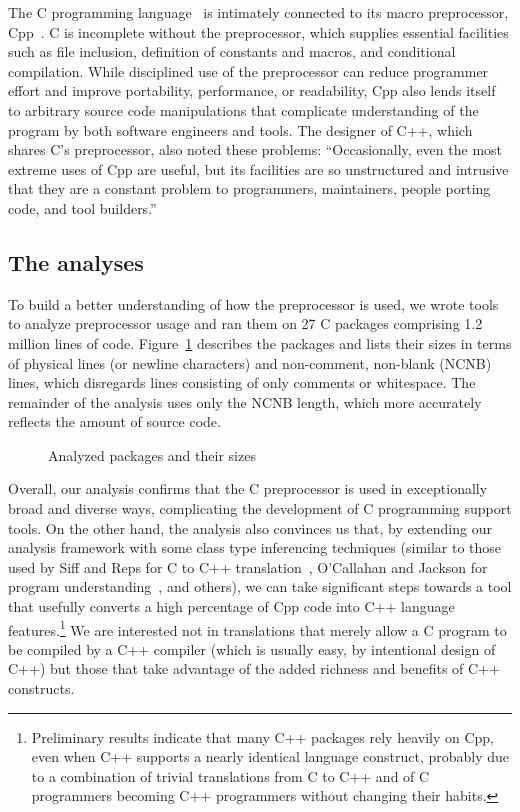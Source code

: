\documentclass[11pt]{article}
\def\numpackages{27}
\def\numlines{1.2 million}
\begin{document}
The C programming language~\cite{ansi} is intimately connected to its macro
preprocessor, Cpp~\cite[Ch.~3]{Harbison91}.   C is incomplete without the
preprocessor, which supplies essential 
facilities such as file inclusion, definition of constants and macros, and
conditional compilation.
While disciplined use of  the preprocessor can reduce programmer effort and 
improve portability, performance, or readability, Cpp also lends itself to
arbitrary source code manipulations that complicate understanding of the
program by both software engineers and tools.  The designer of C++, which
shares C's preprocessor, also noted these problems:
``Occasionally, even the most extreme uses of Cpp are useful, but its
facilities are so unstructured and intrusive that they are a constant
problem to programmers, maintainers, people porting code, and tool
builders.''~\cite[p.~424]{Stroustrup-DesignEvolution}


\subsection{The analyses}

To build a better understanding of how the preprocessor is used,
we wrote tools to analyze preprocessor usage and ran them on {\numpackages}
C packages comprising {\numlines} lines of code.  Figure~\ref{fig:packages}
describes the packages and lists their sizes in terms of physical lines (or
newline characters) and non-comment, non-blank (NCNB) lines, which
disregards lines consisting of only comments or whitespace.  The remainder
of the analysis uses only the NCNB length, which more accurately reflects
the amount of source code.

\begin{figure}
\centering
{%
  \setlength{\tabcolsep}{.25em}
  
}
\caption{Analyzed packages and their sizes}
\label{fig:packages}
\end{figure}


Overall, our analysis confirms that the C preprocessor is used in
exceptionally broad and diverse ways, complicating the development of C
programming support tools.  On the other hand, the analysis also convinces
us that, by extending our analysis framework with some class type
inferencing techniques (similar to those used by Siff and Reps for C to C++
translation~\cite{Siff-fse96}, O'Callahan and Jackson for program
understanding~\cite{OCallahan-icse97}, and others), we can take significant
steps towards a tool that usefully converts a high percentage of Cpp code
into C++ language features.\footnote{Preliminary results indicate that many
  C++ packages rely heavily on Cpp, even when C++ supports a nearly
  identical language construct, probably due to a combination of trivial
  translations from C to C++ and of C programmers becoming C++ programmers
  without changing their habits.} We are interested not in translations
that merely allow a C program to be compiled by a C++ compiler (which is
usually easy, by intentional design of C++) but those that take advantage
of the added richness and benefits of C++ constructs.
\end{document}
